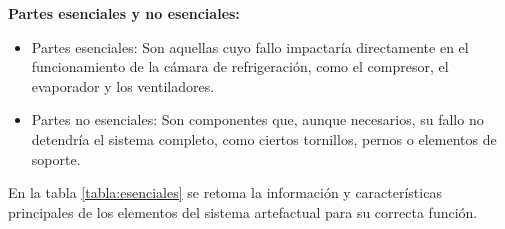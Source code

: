 \textbf{Partes esenciales y no esenciales:}
\begin{itemize}
	\item Partes esenciales: Son aquellas cuyo fallo impactaría directamente en el funcionamiento de la cámara de refrigeración, como el compresor, el evaporador y los ventiladores.
	
	\item Partes no esenciales: Son componentes que, aunque necesarios, su fallo no detendría el sistema completo, como ciertos tornillos, pernos o elementos de soporte.
\end{itemize}

\newpage

\begin{landscape}
	En la tabla \ref{tabla:esenciales} se retoma la información y características principales de los elementos del sistema
	artefactual para su correcta función.
	

\end{landscape}
